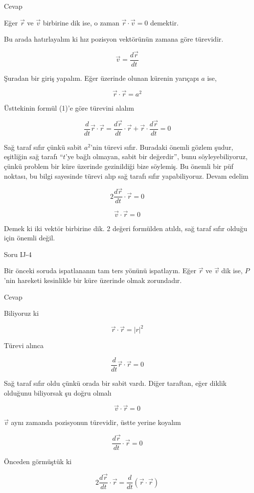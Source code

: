 \documentclass[12pt,fleqn]{article}\usepackage{../../common}
\begin{document}
Cevap

Eğer $\vec{r}$ ve $\vec{v}$ birbirine dik ise, o zaman $\vec{r} \cdot
\vec{v} = 0$ demektir. 

Bu arada hatırlayalım ki hız pozisyon vektörünün zamana göre türevidir. 

$$ \vec{v} = \frac{d\vec{r}}{dt} $$

Şuradan bir giriş yapalım. Eğer üzerinde olunan kürenin yarıçapı $a$ ise, 

$$ \vec{r} \cdot \vec{r} = a^2 $$

Üsttekinin formül (1)'e göre türevini alalım

$$ 
\frac{d}{dt}\vec{r} \cdot \vec{r} =  
\frac{d\vec{r}}{dt} \cdot \vec{r} +
\vec{r} \cdot \frac{d\vec{r}}{dt} = 0
 $$

Sağ taraf sıfır çünkü sabit $a^2$'nin türevi sıfır. Buradaki önemli gözlem
şudur, eşitliğin sağ tarafı ``$t$'ye bağlı olmayan, sabit bir değerdir'', bunu
söyleyebiliyoruz, çünkü problem bir küre üzerinde gezinildiği bize söylemiş. Bu
önemli bir püf noktası, bu bilgi sayesinde türevi alıp sağ tarafı sıfır
yapabiliyoruz. Devam edelim

$$ 
2 \frac{d\vec{r}}{dt} \cdot \vec{r} = 0
$$

$$ \vec{v} \cdot \vec{r} = 0 $$

Demek ki iki vektör birbirine dik. 2 değeri formülden atıldı, sağ taraf
sıfır olduğu için önemli değil.

Soru IJ-4

Bir önceki soruda ispatlananın tam ters yönünü ispatlayın. Eğer $\vec{r}$
ve $\vec{v}$ dik ise, $P$'nin hareketi kesinlikle bir küre üzerinde olmak
zorundadır. 

Cevap

Biliyoruz ki

$$ \vec{r} \cdot \vec{r} = |r|^2 $$

Türevi alınca

$$ 
\frac{d}{dt}\vec{r} \cdot \vec{r} = 0 
 $$

Sağ taraf sıfır oldu çünkü orada bir sabit vardı. Diğer taraftan, eğer
diklik olduğunu biliyorsak şu doğru olmalı

$$ \vec{v} \cdot \vec{r} = 0 $$

$\vec{v}$ aynı zamanda pozisyonun türevidir, üstte yerine koyalım

$$ 
\frac{d\vec{r}}{dt} \cdot \vec{r} = 0
$$

Önceden görmüştük ki 

$$ 
2 \frac{d\vec{r}}{dt} \cdot \vec{r} =
\frac{d}{dt}(\vec{r} \cdot \vec{r})   
 $$
\end{document}
